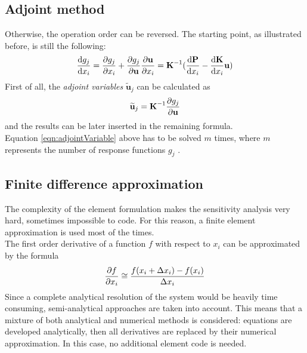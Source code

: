 \subsection{Adjoint method}
Otherwise, the operation order can be reversed. The starting point, as illustrated before, is still the following: 
\begin{equation}
\dv{g_j}{x_i} = \pdv{g_j}{x_i} + \pdv{g_j}{\textbf{u}} \pdv{\textbf{u}}{x_i} =\textbf{K}^{-1} (\dv{\textbf{P}}{x_i} - \dv{\textbf{K}}{x_i}\textbf{u})
\end{equation}
First of all, the \textit{adjoint variables} $\widetilde{\textbf{u}}_j$ can be calculated as 
\begin{equation} \label{eqn:adjointVariable}
\widetilde{\textbf{u}}_j = \textbf{K}^{-1} \pdv{g_j}{\textbf{u}}
\end{equation}
and the results can be later inserted in the remaining formula. \\[3pt]
Equation \ref{eqn:adjointVariable} above has to be solved $m$ times, where $m$ represents the number of response functions $g_j$ \cite{optimization_Bletzinger}.

\subsection{Finite difference approximation}
The complexity of the element formulation makes the sensitivity analysis very hard, sometimes impossible to code. For this reason, a finite element approximation is used most of the times. \\[6pt]
The first order derivative of a function $f$ with respect to $x_i$ can be approximated by the formula 
\begin{equation}
\pdv{f}{x_i} \cong \frac{f(x_i + \Delta x_i) - f(x_i)}{\Delta x_i}
\end{equation}
Since a complete analytical resolution of the system would be heavily time consuming, semi-analytical approaches are taken into account. This means that a mixture of both analytical and numerical methods is considered: equations are developed analytically, then all derivatives are replaced by their numerical approximation.
In this case, no additional element code is needed. \cite{optimization_Bletzinger}
